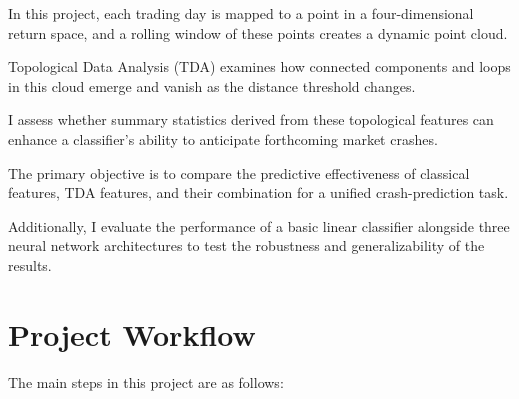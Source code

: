 \documentclass[oneside,english,11pt]{article}
\begin{document}
In this project, each trading day is mapped to a point in a four-dimensional return space, and a rolling window of these points creates a dynamic point cloud. 

Topological Data Analysis (TDA) examines how connected components and loops in this cloud emerge and vanish as the distance threshold changes.

I assess whether summary statistics derived from these topological features can enhance a classifier's ability to anticipate forthcoming market crashes.



The primary objective is to compare the predictive effectiveness of classical features, TDA features, and their combination for a unified crash-prediction task. 

Additionally, I evaluate the performance of a basic linear classifier alongside three neural network architectures to test the robustness and generalizability of the results.

\section{Project Workflow}
\label{sec:workflow}

The main steps in this project are as follows:
\end{document}
